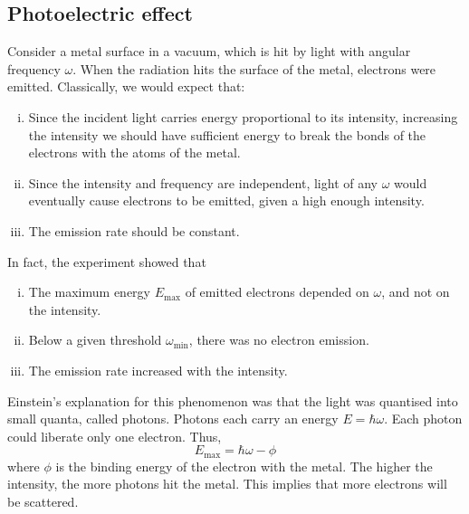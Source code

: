 \subsection{Photoelectric effect}
Consider a metal surface in a vacuum, which is hit by light with angular frequency \( \omega \).
When the radiation hits the surface of the metal, electrons were emitted.
Classically, we would expect that:
\begin{enumerate}[(i)]
	\item Since the incident light carries energy proportional to its intensity, increasing the intensity we should have sufficient energy to break the bonds of the electrons with the atoms of the metal.
	\item Since the intensity and frequency are independent, light of any \( \omega \) would eventually cause electrons to be emitted, given a high enough intensity.
	\item The emission rate should be constant.
\end{enumerate}
In fact, the experiment showed that
\begin{enumerate}[(i)]
	\item The maximum energy \( E_{\max} \) of emitted electrons depended on \( \omega \), and not on the intensity.
	\item Below a given threshold \( \omega_{\min} \), there was no electron emission.
	\item The emission rate increased with the intensity.
\end{enumerate}
Einstein's explanation for this phenomenon was that the light was quantised into small quanta, called photons.
Photons each carry an energy \( E = \hbar \omega \).
Each photon could liberate only one electron.
Thus,
\[
	E_{\max} = \hbar \omega - \phi
\]
where \( \phi \) is the binding energy of the electron with the metal.
The higher the intensity, the more photons hit the metal.
This implies that more electrons will be scattered.

